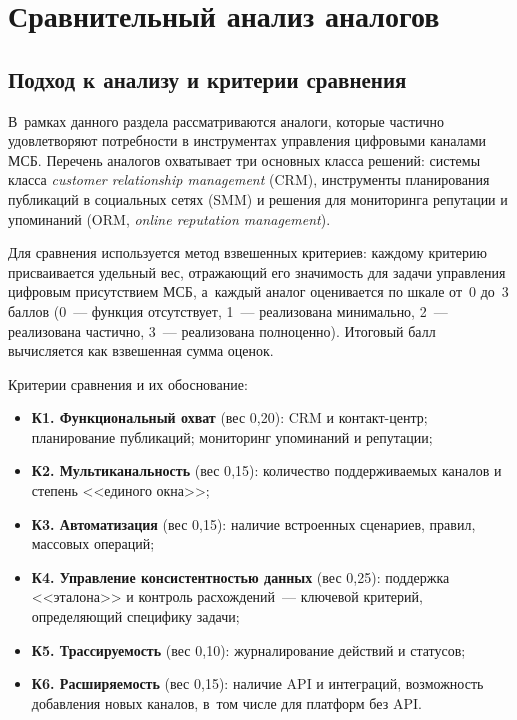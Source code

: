 \section{Сравнительный анализ аналогов}
\label{sec:ch1-analogues}

\subsection{Подход к анализу и критерии сравнения}
\label{subsec:comparison-criteria}

В~рамках данного раздела рассматриваются аналоги, которые частично удовлетворяют потребности в инструментах управления цифровыми каналами МСБ. Перечень аналогов охватывает три основных класса решений: системы класса \textit{customer relationship management} (CRM), инструменты планирования публикаций в социальных сетях (SMM) и решения для мониторинга репутации и упоминаний (ORM, \textit{online reputation management}).

Для сравнения используется метод взвешенных критериев: каждому критерию присваивается удельный вес, отражающий его значимость для задачи управления цифровым присутствием МСБ, а~каждый аналог оценивается по шкале от~0 до~3 баллов (0~--- функция отсутствует, 1~--- реализована минимально, 2~--- реализована частично, 3~--- реализована полноценно). Итоговый балл вычисляется как взвешенная сумма оценок.

Критерии сравнения и их обоснование:

\begin{itemize}
  \item \textbf{К1. Функциональный охват} (вес 0{,}20): CRM и контакт-центр; планирование публикаций; мониторинг упоминаний и репутации;
  \item \textbf{К2. Мультиканальность} (вес 0{,}15): количество поддерживаемых каналов и степень <<единого окна>>;
  \item \textbf{К3. Автоматизация} (вес 0{,}15): наличие встроенных сценариев, правил, массовых операций;
  \item \textbf{К4. Управление консистентностью данных} (вес 0{,}25): поддержка <<эталона>> и контроль расхождений~--- ключевой критерий, определяющий специфику задачи;
  \item \textbf{К5. Трассируемость} (вес 0{,}10): журналирование действий и статусов;
  \item \textbf{К6. Расширяемость} (вес 0{,}15): наличие API и интеграций, возможность добавления новых каналов, в~том числе для платформ без API.
\end{itemize}

